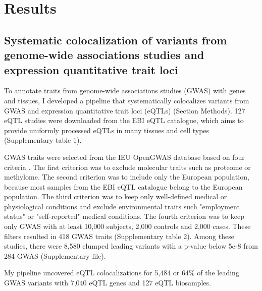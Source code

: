 \section*{Results}\label{s:results}

%
\subsection*{Systematic colocalization of variants from genome-wide associations studies and expression quantitative trait loci}
%

To annotate traits from genome-wide associations studies (GWAS) with genes and tissues,
I developed a pipeline that systematically colocalizes variants from GWAS and expression quantitative trait loci (eQTLs) (Section Methods).
%
127 eQTL studies were downloaded from the EBI eQTL catalogue, which aims to provide uniformly processed eQTLs in many
tissues and cell types \citep{2021.Alasoo.Kerimov} (Supplementary table 1).

GWAS traits were selected from the IEU OpenGWAS database based on four criteria \citep{2018.Parkinson.Buniello}.
%
The first criterion was to exclude molecular traits such as proteome or methylome.
%	
The second criterion was to include only the European population, because most
samples from the EBI eQTL catalogue belong to the European population.
%
The third criterion was to keep only well-defined medical or physiological
conditions and exclude environmental traits such "employment status" or "self-reported" medical conditions.
%
The fourth criterion was to keep only GWAS with at least 10,000 subjects, 2,000 controls and 2,000 cases.
%
These filters resulted in 418 GWAS traits (Supplementary table 2).
%
Among these studies, there were 8,580 clumped leading variants with a p-value below 5e-8 from 284 GWAS (Supplementary file).

My pipeline uncovered eQTL colocalizations for 5,484 or 64$\%$ of the leading GWAS variants with 7,040 eQTL genes and 127 eQTL biosamples.

